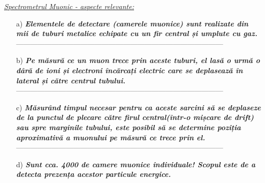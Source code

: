 \documentclass{beamer}
\begin{document}
\begin{frame}{\textit{\href{https://atlas.cern/Discover/Detector/Muon-Spectrometer}{Spectrometrul Muonic - aspecte relevante:}}}

\vspace{-1cm}

\begin{enumerate}
 \small
    \item[a)] \makebox[0.5cm]{}  \textit{\textbf{ Elementele de detectare (camerele muonice) sunt realizate din mii de tuburi metalice echipate cu un fir central și umplute cu gaz.}} \\

    ---------------------------------------------------------------------------------------
    
    \item[b)] \makebox[0.5cm]{}  \textit{\textbf{Pe măsură ce un muon trece prin aceste tuburi, el lasă o urmă o dâră de ioni și electroni încărcați electric care se deplasează în lateral și către centrul tubului.}}\\

    ---------------------------------------------------------------------------------------

    \item[c)] \makebox[0.5cm]{}  \textit{\textbf{ Măsurând timpul necesar pentru ca aceste sarcini să se deplaseze de la punctul de plecare către firul central(într-o mișcare de drift) sau spre marginile tubului, este posibil să se determine poziția aproximativă a muonului pe măsură ce trece prin el.}}\\

    ---------------------------------------------------------------------------------------

    \item[d)] \makebox[0.5cm]{}  \textit{\textbf{ Sunt cca. 4000 de camere muonice individuale! Scopul este de a detecta prezența acestor particule energice.}}\\

\end{enumerate}
\end{frame}
\end{document}
